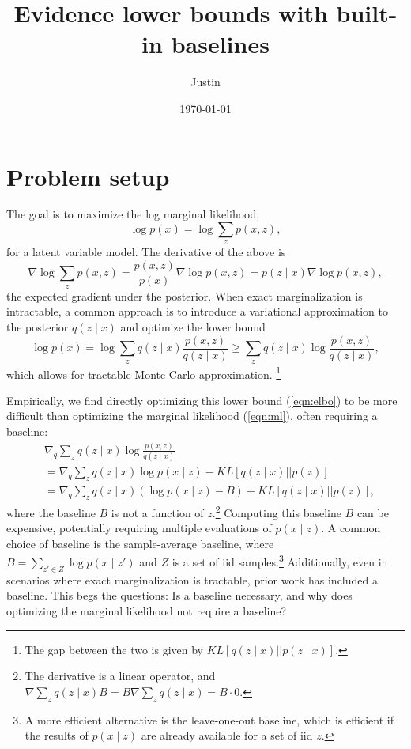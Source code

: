 \documentclass[12pt]{article}
\title{Evidence lower bounds with built-in baselines}
\author{Justin}
\date{\today}
\begin{document}
\maketitle

\section{Problem setup}
The goal is to maximize the log marginal likelihood,
\begin{equation}
\label{eqn:ml}
\log p(x) = \log \sum_z p(x,z),
\end{equation}
for a latent variable model.
The derivative of the above is 
\begin{equation}
\label{eqn:ml-grad}
\nabla \log \sum_z p(x,z)
= \frac{p(x,z)}{p(x)}\nabla \log p(x,z) = 
p(z\mid x)\nabla \log p(x,z),
\end{equation}
the expected gradient under the posterior.
When exact marginalization is intractable,
a common approach is to introduce a variational approximation to the posterior $q(z\mid x)$
and optimize the lower bound
\begin{equation}
\label{eqn:elbo}
\log p(x)
= \log \sum_z q(z\mid x) \frac{p(x,z)}{q(z\mid x)}
\ge \sum_z q(z\mid x) \log \frac{p(x,z)}{q(z\mid x)},
\end{equation}
which allows for tractable Monte Carlo approximation.
\footnote{
The gap between the two is given by $KL[q(z\mid x) || p(z \mid x)]$.
}

Empirically, we find directly optimizing this lower bound (\ref{eqn:elbo}) to be more difficult than
optimizing the marginal likelihood (\ref{eqn:ml}), often requiring a baseline:
\begin{equation}
\label{eqn:baseline}
\begin{aligned}
&\nabla_q \sum_z q(z\mid x) \log \frac{p(x,z)}{q(z\mid x)}\\
&= \nabla_q \sum_z q(z\mid x) \log p(x\mid z) - KL[q(z\mid x) || p(z)]\\
&= \nabla_q \sum_z q(z\mid x) (\log p(x\mid z) - B) - KL[q(z\mid x) || p(z)],
\end{aligned}
\end{equation}
where the baseline $B$ is not a function of $z$.\footnote{
The derivative is a linear operator, and
$\nabla\sum_z q(z\mid x)B = B \nabla \sum_z q(z\mid x) = B \cdot 0$.
}
Computing this baseline $B$ can be expensive,
potentially requiring multiple evaluations of $p(x\mid z)$.
A common choice of baseline is the sample-average baseline, where
$B = \sum_{z' \in Z} \log p(x\mid z')$
and $Z$ is a set of iid samples.\footnote{
A more efficient alternative is the leave-one-out baseline,
which is efficient if the results of $p(x\mid z)$ are already available
for a set of iid $z$.
}
Additionally, even in scenarios where exact marginalization is tractable,
prior work has included a baseline. This begs the questions:
Is a baseline necessary, and why does optimizing the marginal likelihood
not require a baseline?
\end{document}
